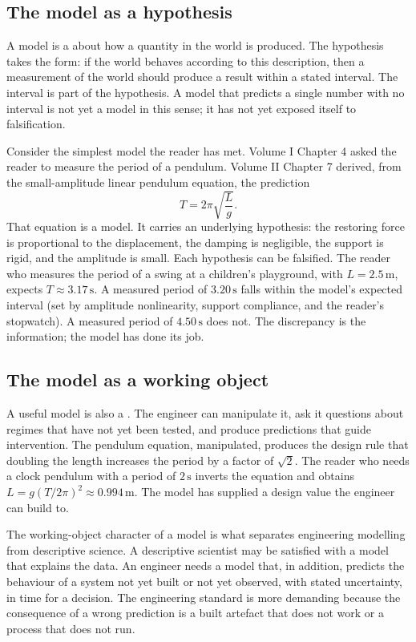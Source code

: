 \subsection{The model as a hypothesis}

A model is a  about how a quantity in the world is
produced. The hypothesis takes the form: if the world behaves according
to this description, then a measurement of the world should produce a
result within a stated interval. The interval is part of the
hypothesis. A model that predicts a single number with no interval is
not yet a model in this sense; it has not yet exposed itself to
falsification.

Consider the simplest model the reader has met. Volume I Chapter 4
asked the reader to measure the period of a pendulum. Volume II
Chapter 7 derived, from the small-amplitude linear pendulum equation,
the prediction
\[
T = 2\pi \sqrt{\frac{L}{g}}.
\]
That equation is a model. It carries an underlying hypothesis: the
restoring force is proportional to the displacement, the damping is
negligible, the support is rigid, and the amplitude is small. Each
hypothesis can be falsified. The reader who measures the period of a
swing at a children's playground, with $L = 2.5\,\si{\meter}$, expects
$T \approx 3.17\,\si{\second}$. A measured period of $3.20\,\si{\second}$
falls within the model's expected interval (set by amplitude
nonlinearity, support compliance, and the reader's stopwatch). A
measured period of $4.50\,\si{\second}$ does not. The discrepancy is the
information; the model has done its job.

\subsection{The model as a working object}

A useful model is also a . The engineer can
manipulate it, ask it questions about regimes that have not yet been
tested, and produce predictions that guide intervention. The pendulum
equation, manipulated, produces the design rule that doubling the
length increases the period by a factor of $\sqrt{2}$. The reader who
needs a clock pendulum with a period of $2\,\si{\second}$ inverts the
equation and obtains $L = g (T / 2\pi)^{2} \approx 0.994\,\si{\meter}$.
The model has supplied a design value the engineer can build to.

The working-object character of a model is what separates engineering
modelling from descriptive science. A descriptive scientist may be
satisfied with a model that explains the data. An engineer needs a
model that, in addition, predicts the behaviour of a system not yet
built or not yet observed, with stated uncertainty, in time for a
decision. The engineering standard is more demanding because the
consequence of a wrong prediction is a built artefact that does not
work or a process that does not run.

